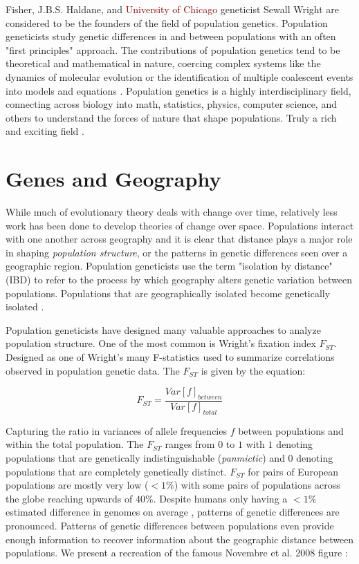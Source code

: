 Fisher, J.B.S. Haldane, and \textcolor{maroon}{University of Chicago} geneticist Sewall Wright are considered to be the founders of the field of population genetics. Population geneticists study genetic differences in and between populations with an often "first principles" approach. The contributions of population genetics tend to be theoretical and mathematical in nature, coercing complex systems like the dynamics of molecular evolution or the identification of multiple coalescent events into models and equations \cite{mcdonald_sex_2016} \cite{rice_distinguishing_2018}. Population genetics is a highly interdisciplinary field, connecting across biology into math, statistics, physics, computer science, and others to understand the forces of nature that shape populations. Truly a rich and exciting field \cite{gillespie_population_2004}.

\section{Genes and Geography}
While much of evolutionary theory deals with change over time, relatively less work has been done to develop theories of change over space. Populations interact with one another across geography and it is clear that distance plays a major role in shaping \textit{population structure}, or the patterns in genetic differences seen over a geographic region. Population geneticists use the term "isolation by distance" (IBD) to refer to the process by which geography alters genetic variation between populations. Populations that are geographically isolated become genetically isolated \cite{rohlf_investigation_1971} \cite{slatkin_isolation_1993}. 


Population geneticists have designed many valuable approaches to analyze population structure. One of the most common is Wright's fixation index $F_{ST}$. Designed as one of Wright's many F-statistics used to summarize correlations observed in population genetic data. The $F_{ST}$ is given by the equation:

\begin{equation}
    F_{ST} = \frac{Var[f]_{between}}{Var[f]_{total}}
\end{equation}

Capturing the ratio in variances of allele frequencies $f$ between populations and within the total population. The $F_{ST}$ ranges from $0$ to $1$ with $1$ denoting populations that are genetically indistinguishable (\textit{panmictic}) and $0$ denoting populations that are completely genetically distinct. $F_{ST}$ for pairs of European populations are mostly very low ($ < 1\%$) \cite{lin_comparison_1994} with some pairs of populations across the globe reaching upwards of $40\%$. Despite humans only having a $ < 1\%$ estimated difference in genomes on average \cite{1k_genomes}, patterns of genetic differences are pronounced. Patterns of genetic differences between populations even provide enough information to recover information about the geographic distance between populations. We present a recreation of the famous Novembre et al. 2008 figure \cite{novembre_genes_2008}:

